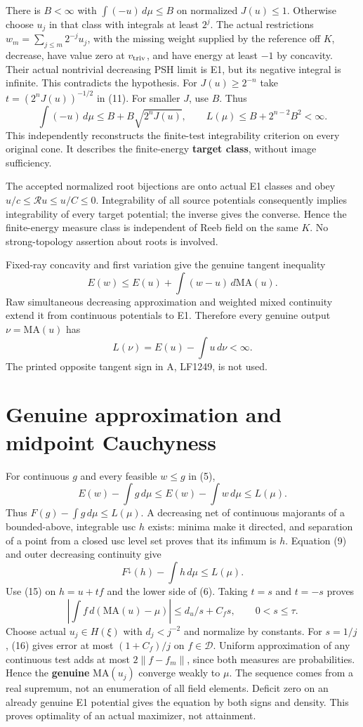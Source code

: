 \documentclass[
  10pt,
]{article}
\begin{document}
There is \(B<\infty\) with \(\int(-u)\,d\mu\le B\) on normalized
\(J(u)\le1\). Otherwise choose \(u_j\) in that class with integrals at
least \(2^j\). The actual restrictions \(w_m=\sum_{j\le m}2^{-j}u_j\),
with the missing weight supplied by the reference off \(K\), decrease,
have value zero at \(v_{\rm triv}\), and have energy at least \(-1\) by
concavity. Their actual nontrivial decreasing PSH limit is E1, but its
negative integral is infinite. This contradicts the hypothesis. For
\(J(u)\ge2^{-n}\) take \(t=(2^nJ(u))^{-1/2}\) in (11). For smaller
\(J\), use \(B\). Thus \[\int(-u)\,d\mu\le B+B\sqrt{2^nJ(u)},\qquad
 L(\mu)\le B+2^{n-2}B^2<\infty. \tag{12}\] This independently
reconstructs the finite-test integrability criterion on every original
cone. It describes the finite-energy \textbf{target class}, without
image sufficiency.

The accepted normalized root bijections are onto actual E1 classes and
obey \(u/c\le\mathcal R u\le u/C\le0\). Integrability of all source
potentials consequently implies integrability of every target potential;
the inverse gives the converse. Hence the finite-energy measure class is
independent of Reeb field on the same \(K\). No strong-topology
assertion about roots is involved.

Fixed-ray concavity and first variation give the genuine tangent
inequality \[E(w)\le E(u)+\int(w-u)\,d\mathrm{MA}(u). \tag{13}\] Raw
simultaneous decreasing approximation and weighted mixed continuity
extend it from continuous potentials to E1. Therefore every genuine
output \(\nu=\mathrm{MA}(u)\) has
\[L(\nu)=E(u)-\int u\,d\nu<\infty. \tag{14}\] The printed opposite
tangent sign in A, LF1249, is not used.

\section{Genuine approximation and midpoint
Cauchyness}\label{genuine-approximation-and-midpoint-cauchyness}

For continuous \(g\) and every feasible \(w\le g\) in (5),
\[E(w)-\int g\,d\mu\le E(w)-\int w\,d\mu\le L(\mu).\] Thus
\(F(g)-\int g\,d\mu\le L(\mu)\). A decreasing net of continuous
majorants of a bounded-above, integrable usc \(h\) exists: minima make
it directed, and separation of a point from a closed usc level set
proves that its infimum is \(h\). Equation (9) and outer decreasing
continuity give \[F^\downarrow(h)-\int h\,d\mu\le L(\mu). \tag{15}\] Use
(15) on \(h=u+tf\) and the lower side of (6). Taking \(t=s\) and
\(t=-s\) proves \[
 \left|\int f\,d(\mathrm{MA}(u)-\mu)\right|\le d_u/s+C_fs,
 \qquad 0<s\le\tau. \tag{16}
\] Choose actual \(u_j\in H(\xi)\) with \(d_j<j^{-2}\) and normalize by
constants. For \(s=1/j\), (16) gives error at most \((1+C_f)/j\) on
\(f\in\mathscr D\). Uniform approximation of any continuous test adds at
most \(2\|f-f_m\|\), since both measures are probabilities. Hence the
\textbf{genuine} \(\mathrm{MA}(u_j)\) converge weakly to \(\mu\). The
sequence comes from a real supremum, not an enumeration of all field
elements. Deficit zero on an already genuine E1 potential gives the
equation by both signs and density. This proves optimality of an actual
maximizer, not attainment.
\end{document}
